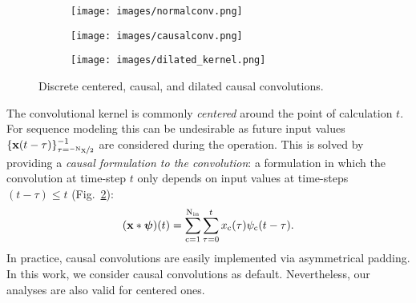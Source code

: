 \documentclass{article}
\renewcommand{\vec}[1]{\ensuremath{\mathbf{\MakeLowercase{{#1}}}}}
\newcommand{\xv}{\vec{x}}
\def\ct{\mathrm{c}}
\def\Nt{\mathrm{N}}
\def\Xt{\mathrm{X}}
\begin{document}
\begin{figure}[t]
     \centering
     \begin{subfigure}[b]{0.26\textwidth}
         \centering
         \texttt{[image: images/normalconv.png]}
         \caption{}
         \label{fig:centered_conv}
     \end{subfigure}
     \hfill
     \begin{subfigure}[b]{0.26\textwidth}
         \centering
         \texttt{[image: images/causalconv.png]}
         \caption{}
         \label{fig:causal_conv}
     \end{subfigure}
     \hfill
     \begin{subfigure}[b]{0.35\textwidth}
         \centering
         \texttt{[image: images/dilated\_kernel.png]}
         \caption{}
         \label{fig:dilated_conv}
     \end{subfigure}
     \vspace{-2mm}
     \caption{Discrete centered, causal, and dilated causal convolutions.
     \vspace{-3.5mm}}
        \label{fig:causal_vs_centered}
\end{figure}
The convolutional kernel is commonly \textit{centered} around the point of calculation $t$. For sequence modeling this can be undesirable as future input values $\{ \xv(t - \tau)\}_{\tau {=} \nicefrac{-\Nt_{\Xt}}{2}}^{-1}$ are considered during the operation. This is solved by providing a \textit{causal formulation to the convolution}: a formulation in which the convolution at time-step $t$ only depends on input values at time-steps $(t - \tau) \leq t$ (Fig.~\ref{fig:causal_conv}):
\begin{equation}
\setlength{\abovedisplayskip}{0pt}
\setlength{\belowdisplayskip}{3pt}
    (\xv * \boldsymbol{\psi})(t) = \sum_{\ct = 1}^{\Nt_{\mathrm{in}}} \sum_{\tau = 0}^{t} x_{\ct}(\tau) \psi_{\ct}(t - \tau). \label{eq:causal_conv}
\end{equation}
In practice, causal convolutions are easily implemented via asymmetrical padding. In this work, we consider causal convolutions as default. Nevertheless, our analyses are also valid for centered ones.
\end{document}
